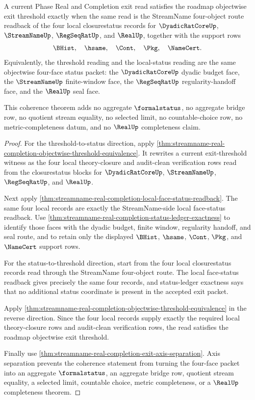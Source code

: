 \begin{theorem}
\label{thm:streamname-real-completion-exit-status-coherence}
A current Phase Real and Completion exit read satisfies the roadmap objectwise exit threshold exactly when the same read is the StreamName four-object route readback of the four local closurestatus records for $\DyadicRatCoreUp$, $\StreamNameUp$, $\RegSeqRatUp$, and $\RealUp$, together with the support rows
$$
\BHist,\quad \hsame,\quad \Cont,\quad \Pkg,\quad \NameCert.
$$
Equivalently, the threshold reading and the local-status reading are the same objectwise four-face status packet: the $\DyadicRatCoreUp$ dyadic budget face, the $\StreamNameUp$ finite-window face, the $\RegSeqRatUp$ regularity-handoff face, and the $\RealUp$ seal face.

This coherence theorem adds no aggregate $\formalstatus$, no aggregate bridge row, no quotient stream equality, no selected limit, no countable-choice row, no metric-completeness datum, and no $\RealUp$ completeness claim.
\end{theorem}
\begin{proof}
For the threshold-to-status direction, apply \autoref{thm:streamname-real-completion-objectwise-threshold-equivalence}. It rewrites a current exit-threshold witness as the four local theory-closure and audit-clean verification rows read from the closurestatus blocks for $\DyadicRatCoreUp$, $\StreamNameUp$, $\RegSeqRatUp$, and $\RealUp$.

Next apply \autoref{thm:streamname-real-completion-local-face-status-readback}. The same four local records are exactly the StreamName-side local face-status readback. Use \autoref{thm:streamname-real-completion-status-ledger-exactness} to identify those faces with the dyadic budget, finite window, regularity handoff, and seal route, and to retain only the displayed $\BHist$, $\hsame$, $\Cont$, $\Pkg$, and $\NameCert$ support rows.

For the status-to-threshold direction, start from the four local closurestatus records read through the StreamName four-object route. The local face-status readback gives precisely the same four records, and status-ledger exactness says that no additional status coordinate is present in the accepted exit packet.

Apply \autoref{thm:streamname-real-completion-objectwise-threshold-equivalence} in the reverse direction. Since the four local records supply exactly the required local theory-closure rows and audit-clean verification rows, the read satisfies the roadmap objectwise exit threshold.

Finally use \autoref{thm:streamname-real-completion-exit-axis-separation}. Axis separation prevents the coherence statement from turning the four-face packet into an aggregate $\formalstatus$, an aggregate bridge row, quotient stream equality, a selected limit, countable choice, metric completeness, or a $\RealUp$ completeness theorem.
\end{proof}

